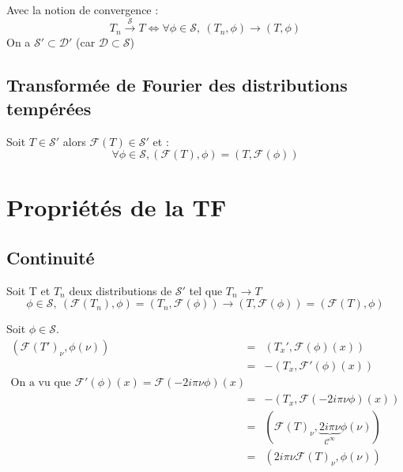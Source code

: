 \documentclass{article}
\begin{document}
Avec la notion de convergence : 
\[T_n \xrightarrow{\mathcal{S}} T \Leftrightarrow \forall \phi\in \mathcal{S},\ (T_n,\phi)\to (T,\phi)\]
On a $\mathcal{S}' \subset \mathcal{D}'$ (car $\mathcal{D} \subset \mathcal{S}$)

\subsection{Transformée de Fourier des distributions tempérées}
Soit $T\in \mathcal{S}'$ alors $\mathcal{F}(T) \in \mathcal{S}'$ et :
\[\forall \phi \in \mathcal{S}, (\mathcal{F}(T),\phi)=(T,\mathcal{F}(\phi))\]

\section{Propriétés de la TF}
\subsection{Continuité}
\begin{dem}
Soit T et $T_n$ deux distributions de $\mathcal{S}'$ tel que $T_n \to T$
\[\phi\in\mathcal{S},\ (\mathcal{F}(T_n),\phi)=(T_n,\mathcal{F}(\phi)) \to (T,\mathcal{F}(\phi))=(\mathcal{F}(T),\phi)\]
\end{dem}



\begin{dem}
Soit $\phi \in \mathcal{S}$.
\begin{eqnarray*}
(\mathcal{F}(T')_{\nu},\phi(\nu))&=&(T_x',\mathcal{F}(\phi)(x)) \\
	&=&-(T_x,\mathcal{F}'(\phi)(x)) \\
\text{On a vu que } \mathcal{F}'(\phi)(x)=\mathcal{F}(-2i\pi\nu\phi)(x) \\
	&=& -(T_x,\mathcal{F}(-2i\pi\nu\phi)(x)) \\
	&=& (\mathcal{F}(T)_{\nu},\underbrace{2i\pi\nu}_{\mathcal{C}^{\infty}}\phi(\nu)) \\
	&=& (2i\pi\nu\mathcal{F}(T)_{\nu},\phi(\nu))
\end{eqnarray*}
\end{dem}
\end{document}
